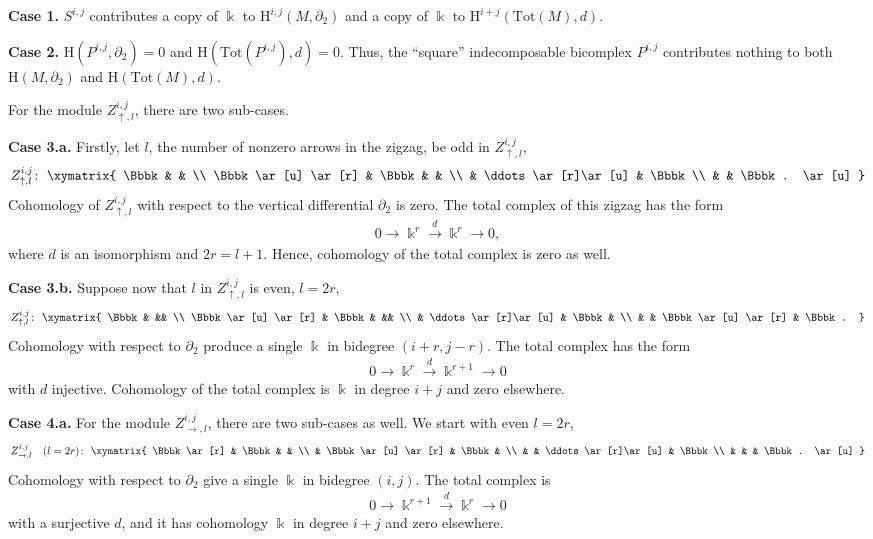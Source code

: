 \documentclass[10pt,a4paper]{amsart}
\theoremstyle{definition}
\numberwithin{equation}{section}
\def\dif{\partial}
\def\lra{{\longrightarrow}}
\newcommand{\mH}{\mathrm{H}} %
\newcommand{\Tot}{\mathrm{Tot}}
\begin{document}
{\bf Case 1.} $S^{i,j}$ contributes a copy of $\Bbbk$ to $\mH^{i,j}(M,\dif_2)$
and a copy of $\Bbbk$ to $\mH^{i+j}(\Tot(M),d)$.

{\bf Case 2.} $\mH(P^{i,j},\dif_2)=0$ and $\mH(\Tot(P^{i,j}),d)=0$. Thus,
the ``square'' indecomposable bicomplex $P^{i,j}$ contributes nothing to both $\mH(M,\dif_2)$ and $\mH(\Tot(M),d)$.

For the module $Z^{i,j}_{\uparrow,l}$, there are two sub-cases.

{\bf Case 3.a.}
Firstly, let $l$, the number of nonzero arrows in the zigzag, be odd in $Z^{i,j}_{\uparrow,l}$,
 \[
Z^{i,j}_{\uparrow,l}\colon \
\begin{gathered}
\xymatrix{
 \Bbbk & & \\
 \Bbbk\ar[u] \ar[r] & \Bbbk & & \\
 & \ddots \ar[r]\ar[u] & \Bbbk \\
 & & \Bbbk. \ar[u]
}
\end{gathered}
\]
Cohomology of $Z^{i,j}_{\uparrow,l}$ with respect to the vertical
differential $\dif_2$ is zero. The total complex of this zigzag
has the form
\begin{gather*}0 \lra \Bbbk^r \stackrel{d}{\lra} \Bbbk^r \lra 0, \end{gather*}
where $d$ is an isomorphism and $2r = l+1$. Hence, cohomology
of the total complex is zero as well.

{\bf Case 3.b.} Suppose now that $l$ in $Z^{i,j}_{\uparrow,l}$ is even, $l=2r$,
 \[
Z^{i,j}_{\uparrow,l}\colon \
\begin{gathered}
\xymatrix{
 \Bbbk & && \\
 \Bbbk\ar[u] \ar[r] & \Bbbk & && \\
 & \ddots \ar[r]\ar[u] & \Bbbk & \\
 & & \Bbbk \ar[u] \ar[r] & \Bbbk.
}
\end{gathered}
\]
Cohomology with respect to $\dif_2$ produce a single $\Bbbk$ in
bidegree $(i+r,j-r)$. The total complex has the form
\begin{gather*} 0 \lra \Bbbk^r \stackrel{d}{\lra} \Bbbk^{r+1} \lra 0 \end{gather*}
with $d$ injective. Cohomology of the total complex is $\Bbbk$
in degree $i+j$ and zero elsewhere.

{\bf Case 4.a.}
For the module $Z^{i,j}_{\rightarrow,l}$, there are two sub-cases as well. We start with even $l=2r$,
\[
Z^{i,j}_{\rightarrow,l} \quad (l=2r)\colon \
\begin{gathered}
\xymatrix{
 \Bbbk \ar[r] & \Bbbk & & \\
 & \Bbbk\ar[u] \ar[r] & \Bbbk & \\
 & & \ddots \ar[r]\ar[u] & \Bbbk\\
 & & & \Bbbk. \ar[u]
}
\end{gathered}
\]
Cohomology with respect to $\dif_2$ give a single $\Bbbk$ in
bidegree $(i,j)$. The total complex is
\begin{gather*} 0 \lra \Bbbk^{r+1} \stackrel{d}{\lra} \Bbbk^r \lra 0\end{gather*}
with a surjective $d$, and it has cohomology $\Bbbk$
in degree $i+j$ and zero elsewhere.
\end{document}
